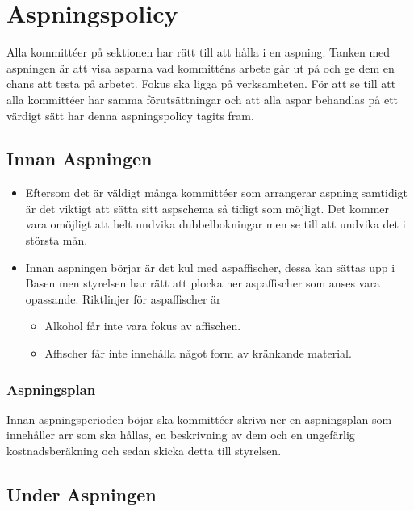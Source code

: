 \section{Aspningspolicy}
Alla kommittéer på sektionen har rätt till att hålla i en aspning. Tanken med aspningen är att visa asparna vad kommitténs arbete går ut på och ge dem en chans att testa på arbetet. Fokus ska ligga på verksamheten. För att se till att alla kommittéer har samma förutsättningar och att alla aspar behandlas på ett värdigt sätt har denna aspningspolicy tagits fram. 

\subsection{Innan Aspningen}
\begin{itemize}
    \item Eftersom det är väldigt många kommittéer som arrangerar aspning samtidigt är det viktigt att sätta sitt aspschema så tidigt som möjligt. Det kommer vara omöjligt att helt undvika dubbelbokningar men se till att undvika det i största mån. 
    \item Innan aspningen börjar är det kul med aspaffischer, dessa kan sättas upp i Basen men styrelsen har rätt att plocka ner aspaffischer som anses vara opassande. Riktlinjer för aspaffischer är
    \begin{itemize}
        \item Alkohol får inte vara fokus av affischen.
        \item Affischer får inte innehålla något form av kränkande material. 
    \end{itemize}
\end{itemize}
\subsubsection{Aspningsplan}
Innan aspningsperioden böjar ska kommittéer skriva ner en aspningsplan som innehåller arr som ska hållas, en beskrivning av dem och en ungefärlig kostnadsberäkning och sedan skicka detta till styrelsen. 


\subsection{Under Aspningen}
